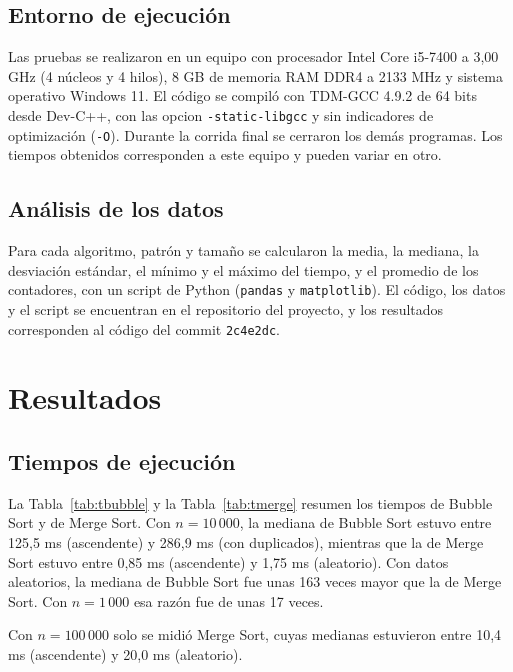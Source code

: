 \documentclass[12pt,a4paper,twocolumn]{article}
\begin{document}
\subsection{Entorno de ejecución}
 
Las pruebas se realizaron en un equipo con procesador Intel Core
i5-7400 a 3,00 GHz (4 núcleos y 4 hilos), 8 GB de memoria RAM DDR4 a
2133 MHz y sistema operativo Windows 11. El código se compiló con
TDM-GCC 4.9.2 de 64 bits desde Dev-C++, con las opcion
\texttt{-static-libgcc} y sin indicadores de
optimización (\texttt{-O}). Durante la corrida final se cerraron los demás programas. Los
tiempos obtenidos corresponden a este equipo y pueden variar en otro.
 
\subsection{Análisis de los datos}
 
Para cada algoritmo, patrón y tamaño se calcularon la media, la
mediana, la desviación estándar, el mínimo y el máximo del tiempo, y
el promedio de los contadores, con un script de Python (\texttt{pandas}
y \texttt{matplotlib}). El código, los datos y el script se
encuentran en el repositorio del proyecto, y los
resultados corresponden al código del commit \texttt{2c4e2dc}.
 
\section{Resultados}
 
\subsection{Tiempos de ejecución}
 
La Tabla~\ref{tab:tbubble} y la Tabla~\ref{tab:tmerge} resumen los
tiempos de Bubble Sort y de Merge Sort. Con $n = 10\,000$, la mediana de
Bubble Sort estuvo entre 125,5 ms (ascendente) y 286,9 ms (con
duplicados), mientras que la de Merge Sort estuvo entre 0,85 ms
(ascendente) y 1,75 ms (aleatorio). Con datos aleatorios, la mediana de
Bubble Sort fue unas 163 veces mayor que la de Merge Sort. Con
$n = 1\,000$ esa razón fue de unas 17 veces.
 
Con $n = 100\,000$ solo se midió Merge Sort, cuyas medianas
estuvieron entre 10,4 ms (ascendente) y 20,0 ms (aleatorio).
 
\end{document}
